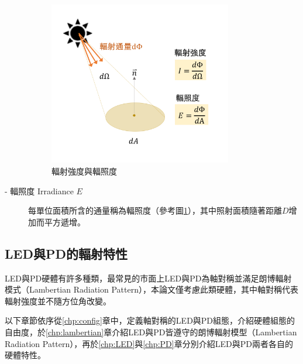 \begin{description}
                \begin{figure}[h!]
                    \centering
                    \includegraphics[width=8cm]{ch2pic/intensity_irradiance.png}
                    \caption{輻射強度與輻照度}
                    \label{pic:intensity_irradiance}
                \end{figure}

            \item[- 輻照度 Irradiance $E$] \hfill
                
                \qquad
                每單位面積所含的通量稱為輻照度（參考圖\ref{pic:intensity_irradiance}），其中照射面積隨著距離$D$增加而平方遞增。

                
             
        \end{description}

        

        

    \subsection{LED與PD的輻射特性}
    \label{chp:LEDPD_radiate}

    LED與PD硬體有許多種類，最常見的市面上LED與PD為軸對稱並滿足朗博輻射模式（Lambertian Radiation Pattern），本論文僅考慮此類硬體，其中軸對稱代表輻射強度並不隨方位角改變。

    以下章節依序從\ref{chp:config}章中，定義軸對稱的LED與PD組態，介紹硬體組態的自由度，於\ref{chp:lambertian}章介紹LED與PD皆遵守的朗博輻射模型（Lambertian Radiation Pattern），再於\ref{chp:LED}與\ref{chp:PD}章分別介紹LED與PD兩者各自的硬體特性。
        
